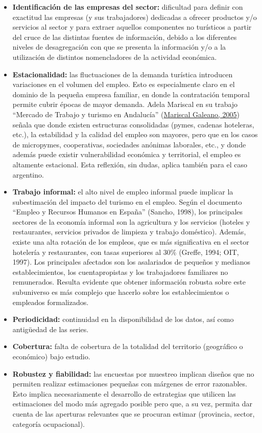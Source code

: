 \documentclass[
  openany]{book}
\providecommand{\tightlist}{%
  \setlength{\itemsep}{0pt}\setlength{\parskip}{0pt}}
\begin{document}
\begin{itemize}
\tightlist
\item
  \textbf{Identificación de las empresas del sector:} dificultad para definir con exactitud las empresas (y sus trabajadores) dedicadas a ofrecer productos y/o servicios al sector y para extraer aquellos componentes no turísticos a partir del cruce de las distintas fuentes de información, debido a los diferentes niveles de desagregación con que se presenta la información y/o a la utilización de distintos nomencladores de la actividad económica.
\item
  \textbf{Estacionalidad:} las fluctuaciones de la demanda turística introducen variaciones en el volumen del empleo. Esto es especialmente claro en el dominio de la pequeña empresa familiar, en donde la contratación temporal permite cubrir épocas de mayor demanda. Adela Mariscal en su trabajo ``Mercado de Trabajo y turismo en Andalucía'' (\protect\hyperlink{ref-mariscal2005}{Mariscal Galeano, 2005}) señala que donde existen estructuras consolidadas (pymes, cadenas hoteleras, etc.), la estabilidad y la calidad del empleo son mayores, pero que en los casos de micropymes, cooperativas, sociedades anónimas laborales, etc., y donde además puede existir vulnerabilidad económica y territorial, el empleo es altamente estacional. Esta reflexión, sin dudas, aplica también para el caso argentino.
\item
  \textbf{Trabajo informal:} el alto nivel de empleo informal puede implicar la subestimación del impacto del turismo en el empleo. Según el documento ``Empleo y Recursos Humanos en España'' (Sancho, 1998), los principales sectores de la economía informal son la agricultura y los servicios (hoteles y restaurantes, servicios privados de limpieza y trabajo doméstico). Además, existe una alta rotación de los empleos, que es más significativa en el sector hotelería y restaurantes, con tasas superiores al 30\% (Greffe, 1994; OIT, 1997). Los principales afectados son los asalariados de pequeños y medianos establecimientos, los cuentapropistas y los trabajadores familiares no remunerados. Resulta evidente que obtener información robusta sobre este subuniverso es más complejo que hacerlo sobre los establecimientos o empleados formalizados.
\item
  \textbf{Periodicidad:} continuidad en la disponibilidad de los datos, así como antigüedad de las series.
\item
  \textbf{Cobertura:} falta de cobertura de la totalidad del territorio (geográfico o económico) bajo estudio.
\item
  \textbf{Robustez y fiabilidad:} las encuestas por muestreo implican diseños que no permiten realizar estimaciones pequeñas con márgenes de error razonables. Esto implica necesariamente el desarrollo de estrategias que utilicen las estimaciones del modo más agregado posible pero que, a su vez, permita dar cuenta de las aperturas relevantes que se procuran estimar (provincia, sector, categoría ocupacional).
\end{itemize}
\end{document}
